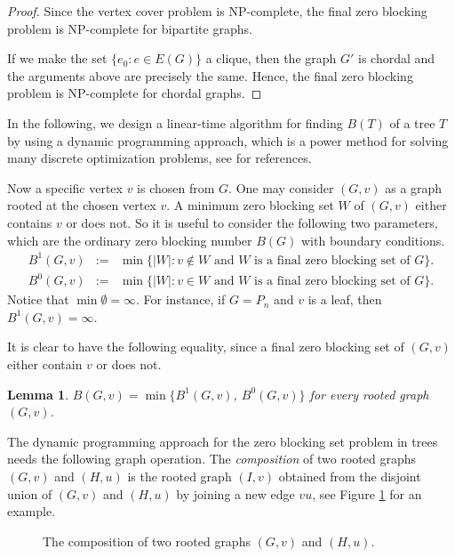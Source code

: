 \documentclass[preprint,12pt]{elsarticle}
\newtheorem{lemma}[theorem]{Lemma}
\begin{document}
{\begin{proof}
Since the vertex cover problem is NP-complete,
the {final} zero blocking problem is NP-complete for bipartite graphs.

If we make the set $\{e_0: e\in E(G)\}$ a clique, then the graph $G'$ is chordal and the arguments above are precisely the same.
Hence, the {final} zero blocking problem is NP-complete for chordal graphs.
\end{proof}


In the following, we design a linear-time algorithm for finding $B(T)$ of a tree $T$
by using a dynamic programming approach,
which is a power method for solving many discrete optimization problems,
see \cite{1962bd,2025c,1977dL,1966n} for references.

Now a specific vertex $v$ is chosen from $G$.
One may consider $(G,v)$ as a graph rooted at the chosen vertex $v$.
A minimum zero blocking set $W$ of $(G,v)$ either contains $v$ or does not.
So it is useful to consider the following two parameters, which are the ordinary zero blocking number $B(G)$ with boundary conditions.
%
\begin{eqnarray*}
 B^1(G,v) &:=& \min\{|W|: \mbox{$v\notin W$ and $W$ is a {final} zero blocking set of $G$} \}. \\
 B^0(G,v) &:=& \min\{|W|: \mbox{$v\in W$ and $W$ is a {final} zero blocking set of $G$} \}.
\end{eqnarray*}
%
Notice that $\min \emptyset=\infty$.
For instance, if $G=P_n$ and $v$ is a leaf, then $B^1(G,v)=\infty$.

It is clear to have the following equality, since a {final} zero blocking set of $(G,v)$ either contain $v$ or does not.

\begin{lemma} \label{zbs1}
$B(G,v) = \min\{B^1(G,v)$, $B^0(G,v)\}$ for every rooted graph $(G,v)$.
\end{lemma}

The dynamic programming approach for the zero blocking set problem in trees needs the following graph operation.
The {\em composition} of two rooted graphs $(G,v)$ and $(H,u)$ is the rooted graph $(I,v)$   
obtained from the disjoint union of $(G,v)$ and $(H,u)$ by joining a new edge $vu$, see Figure \ref{s4f4} for an example.

\begin{figure}[htb]
\centering
{} 
\caption{The composition of two rooted graphs $(G,v)$ and $(H,u)$.} \label{s4f4}
\end{figure}

}
\end{document}

